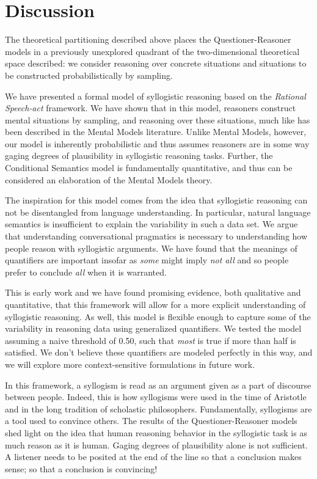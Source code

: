 \documentclass[10pt,letterpaper]{article}
\begin{document}
\section{Discussion}

The theoretical partitioning described above places the Questioner-Reasoner models in a previously unexplored quadrant of the two-dimensional theoretical space described: we consider reasoning over concrete situations and situations to be constructed probabilistically by sampling.

We have presented a formal model of syllogistic reasoning based on the \emph{Rational Speech-act} framework. We have shown that in this model, reasoners construct mental situations by sampling, and reasoning over these situations, much like has been described in the Mental Models literature. Unlike Mental Models, however, our model is inherently probabilistic and thus assumes reasoners are in some way gaging degrees of plausibility in syllogistic reasoning tasks. Further, the Conditional Semantics model is fundamentally quantitative, and thus can be considered an elaboration of the Mental Models theory.

The inspiration for this model comes from the idea that syllogistic reasoning can not be disentangled from language understanding. In particular, natural language semantics is insufficient to explain the variability in such a data set. We argue that understanding conversational pragmatics is necessary to understanding how people reason with syllogistic arguments. We have found that the meanings of quantifiers are important insofar as \emph{some} might imply \emph{not all} and so people prefer to conclude \emph{all} when it is warranted. 

This is early work and we have found promising evidence, both qualitative and quantitative, that this framework will allow for a more explicit understanding of syllogistic reasoning. As well, this model is flexible enough to capture some of the variability in reasoning data using generalized quantifiers. We tested the model assuming a naive threshold of 0.50, such that \emph{most} is true if more than half is satisfied. We don't believe these quantifiers are modeled perfectly in this way, and we will explore more context-sensitive formulations in future work.

In this framework, a syllogism is read as an argument given as a part of discourse between people. Indeed, this is how syllogisms were used in the time of Aristotle and in the long tradition of scholastic philosophers. Fundamentally, syllogisms are a tool used to convince others. The results of the Questioner-Reasoner models shed light on the idea that human reasoning behavior in the syllogistic task is as much reason as it is human. Gaging degrees of plausibility alone is not sufficient. A listener needs to be posited at the end of the line so that a conclusion makes sense; so that a conclusion is convincing!
\end{document}
